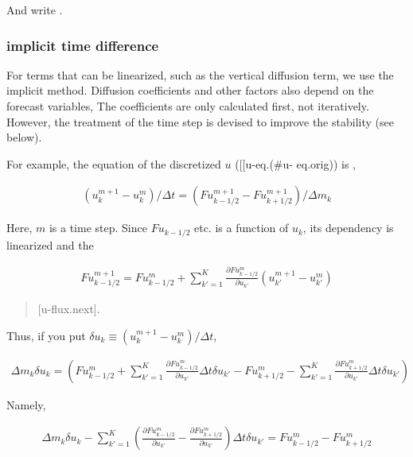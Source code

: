 And write .

\hypertarget{implicit-time-difference}{%
\subsubsection{implicit time
difference}\label{implicit-time-difference}}

For terms that can be linearized, such as the vertical diffusion term,
we use the implicit method. Diffusion coefficients and other factors
also depend on the forecast variables, The coefficients are only
calculated first, not iteratively. However, the treatment of the time
step is devised to improve the stability (see below).

For example, the equation of the discretized \(u\)
({[}{[}u-eq.\origorig{]}{]}(\#u- eq.orig)) is ,

\begin{eqnarray}
  (u_k^{m+1} - u_k^{m})/\Delta t
    = (Fu^{m+1}_{k-1/2}-Fu^{m+1}_{k+1/2})/\Delta m_k
\end{eqnarray}

Here, \(m\) is a time step. Since \(Fu_{k-1/2}\) etc. is a function of
\(u_k\), its dependency is linearized and the

\begin{eqnarray}
   Fu^{m+1}_{k-1/2}
  =  Fu^{m}_{k-1/2}
  +  \sum_{k'=1}^{K}
     \frac{\partial Fu^{m}_{k-1/2}}{\partial u_{k'}} (u^{m+1}_{k'}-u^{m}_{k'})
\end{eqnarray}

\begin{quote}
\protect\hypertarget{u-flux.next}{}{{[}u-flux.next{]}}.
\end{quote}

Thus, if you put \(\delta u_k \equiv (u^{m+1}_{k}-u^{m}_{k})/\Delta t\),

\begin{eqnarray}
  \Delta m_k \delta u_k
  =   \left( Fu^{m}_{k-1/2}
         +  \sum_{k'=1}^{K}
            \frac{\partial Fu^{m}_{k-1/2}}{\partial u_{k'}} \Delta t \delta u_{k'}
         -   Fu^{m}_{k+1/2}
         -  \sum_{k'=1}^{K}
            \frac{\partial Fu^{m}_{k+1/2}}{\partial u_{k'}} \Delta t \delta u_{k'}
      \right)
\end{eqnarray}

Namely,

\begin{eqnarray}
  \Delta m_k \delta u_k
  -  \sum_{k'=1}^{K} \left(  \frac{\partial Fu^{m}_{k-1/2}}{\partial u_{k'}}
                       - \frac{\partial Fu^{m}_{k+1/2}}{\partial u_{k'}} \right)
                 \Delta t\delta u_{k'}
  = Fu^{m}_{k-1/2} - Fu^{m}_{k+1/2}
\end{eqnarray}

